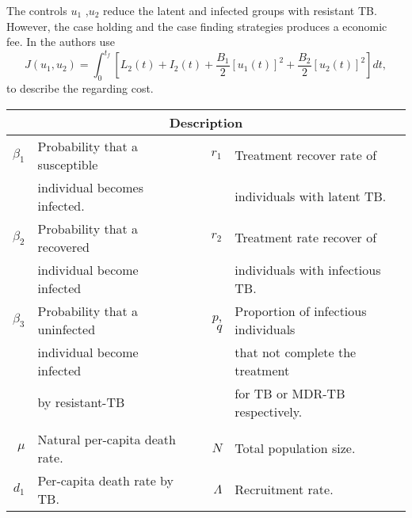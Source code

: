 	The controls $u_1$ ,$u_2$ reduce the latent and infected 
groups with resistant TB. However, the case holding and the case finding 
strategies produces a economic fee. In \cite{Lenhart2002} the authors use
\begin{equation}
	 J(u_1, u_2) =
		 \int_0 ^ {t_f}
			 \left[
				 L_2(t) + I_2(t) 
				 + \frac{B_1}{2} [u_1(t)] ^ 2
				 + \frac{B_2}{2} [u_2(t)] ^ 2
			 \right]dt,
\end{equation}
to describe the regarding cost.
%
%
\begin{table}[htb]
  \centering
  \begin{tabular}{rllrl}
    \toprule
       \multicolumn{5}{c}{\textbf{Description}}\\
        \midrule
        $\beta_1$ 
            & Probability that a susceptible 
        &&
          $r_1$ 
            & 
            Treatment recover rate of 
        \\
         & individual becomes infected.
           &&&
            individuals with latent TB.
        \\
        $\beta_2$ 
          & Probability that a recovered 
        && 
          $r_2$ 
            &
            Treatment rate recover of 
          \\
          & individual  become infected
            &&&
              individuals with infectious TB.
          \\
        $\beta_3$ 
          & Probability that a uninfected 
          &&
          $p$, $q$
          & 
            Proportion of infectious individuals 
          \\
          & individual become infected 
            &&&
              that not complete the treatment
            \\
          & by resistant-TB 
            &&&
              for TB or MDR-TB respectively.
      \\
      \\
        $\mu$ 
          & Natural per-capita death rate.
          &&
            $N$ 
            &
              Total population size.
      \\
        $d_1$ 
          & Per-capita death rate by TB.
          &&
            $\Lambda$
            & Recruitment rate.
              

\end{tabular}
\end{table}
